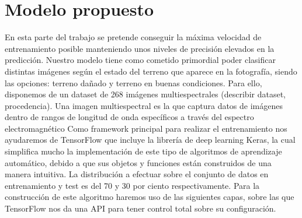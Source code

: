 \section{Modelo propuesto}\label{sec:modelo-propuesto}
En esta parte del trabajo se pretende conseguir la máxima velocidad de entrenamiento posible manteniendo unos niveles de precisión elevados en la predicción. Nuestro modelo tiene como cometido primordial poder clasificar distintas imágenes según el estado del terreno que aparece en la fotografía, siendo las opciones: terreno dañado y terreno en buenas condiciones.
Para ello, disponemos de un dataset de 268 imágenes multiespectrales (describir dataset, procedencia).
Una imagen multiespectral es la que captura datos de imágenes dentro de rangos de longitud de onda específicos a través del espectro electromagnético
Como framework principal para realizar el entrenamiento nos ayudaremos de TensorFlow que incluye la librería de deep learning Keras, la cual simplifica mucho la implementación de este tipo de algoritmos de aprendizaje automático, debido a que sus objetos y funciones están construidos de una manera intuitiva.
La distribución a efectuar sobre el conjunto de datos en entrenamiento y test es del 70 y 30 por ciento respectivamente.
Para la construcción de este algoritmo haremos uso de las siguientes capas, sobre las que TensorFlow nos da una API para tener control total sobre su configuración.
